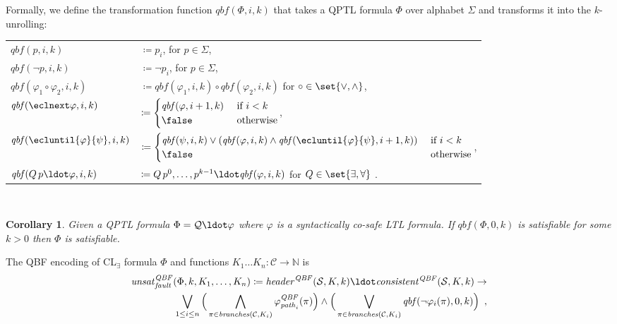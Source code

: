 \documentclass{LMCS}
\newcommand{\branches}{\mathit{branches}}
\newcommand{\header}{\mathit{header}}
\newcommand{\consistent}{\mathit{consistent}}
\newcommand{\unsatnf}{\mathit{unsat}_\mathit{fault}}
\newcommand{\qbftransformer}{\mathit{qbf}}
\theoremstyle{plain}\newtheorem{theorem}[thm]{Theorem}
\theoremstyle{plain}\newtheorem{lemma}[thm]{Lemma}
\theoremstyle{plain}\newtheorem{proposition}[thm]{Proposition}
\theoremstyle{plain}\newtheorem{corollary}[thm]{Corollary}
\theoremstyle{definition}\newtheorem{definition}{Definition}[section]
\begin{document}
Formally, we define the transformation function $\qbftransformer(\Phi,i,k)$ that takes a QPTL formula $\Phi$ over alphabet $\Sigma$ and transforms it into the $k$-unrolling:\smallskip\\
\begin{tabular}{L l}
  $\qbftransformer(p, i, k)$ & $\coloneqq p_i$, for $p \in \Sigma$,\\[1pt]
  $\qbftransformer(\neg p, i, k)$ & $\coloneqq \neg p_i$, for $p \in \Sigma$,\\[1pt]
  $\qbftransformer(\varphi_1 \circ \varphi_2, i, k)$ & $\coloneqq \qbftransformer(\varphi_1, i, k) \circ \qbftransformer(\varphi_2, i, k)$ for $\circ \in \set{\lor,\land}$,\\[1pt]
  $\qbftransformer(\eclnext \varphi, i, k)$ & $\coloneqq \begin{cases}
    \qbftransformer(\varphi, i+1, k) & \text{ if } i < k \\
    \false & \text{ otherwise}
  \end{cases}$,\\[1pt]
  $\qbftransformer(\ecluntil{\varphi}{\psi}, i, k)$ & $\coloneqq \begin{cases}
    \qbftransformer(\psi, i, k) \lor (\qbftransformer(\varphi, i, k) \land \qbftransformer(\ecluntil{\varphi}{\psi}, i+1, k)) & \text{ if } i < k \\
    \false & \text{ otherwise}
  \end{cases}$,\\[1pt]
  $\qbftransformer(Q\, p \ldot \varphi, i, k)$ & $\coloneqq Q\, p^0,\dots,p^{k-1} \ldot \qbftransformer(\varphi, i, k)$ for $Q \in \set{\exists,\forall}$ \enspace.
\end{tabular}\smallskip\\
\begin{corollary} \label{thm:co-safety-qbf}
Given a QPTL formula $\Phi = \mathcal{Q} \ldot \varphi$ where $\varphi$ is a syntactically co-safe LTL formula.
If $\qbftransformer(\Phi,0,k)$ is satisfiable for some $k > 0$ then $\Phi$ is satisfiable.
\end{corollary}\noindent
The QBF encoding of CL$_\exists$ formula $\Phi$ and functions $K_1 \dots K_n : \mathcal{C} \rightarrow \mathbb{N}$ is
\begin{align} \label{eq:node_failure_transform_qbf}
  \unsatnf^\mathit{QBF}(\Phi,k,K_1,\dots,K_n) \coloneqq
  \header^\mathit{QBF}(\mathcal{S}, K,k) \ldot
  \consistent^\mathit{QBF}(\mathcal{S},K,k) \rightarrow \nonumber \\
  \bigvee_{1 \leq i \leq n}
  \Big( \bigwedge_{\pi \in \branches(\mathcal{C},K_i)} \varphi_{\mathit{path}_i}^\mathit{QBF}(\pi) \Big) \land
  \Big( \bigvee_{\pi \in \branches(\mathcal{C},K_i)} \qbftransformer(\neg\varphi_i(\pi),0,k) \Big) \enspace,
\end{align}
\end{document}
